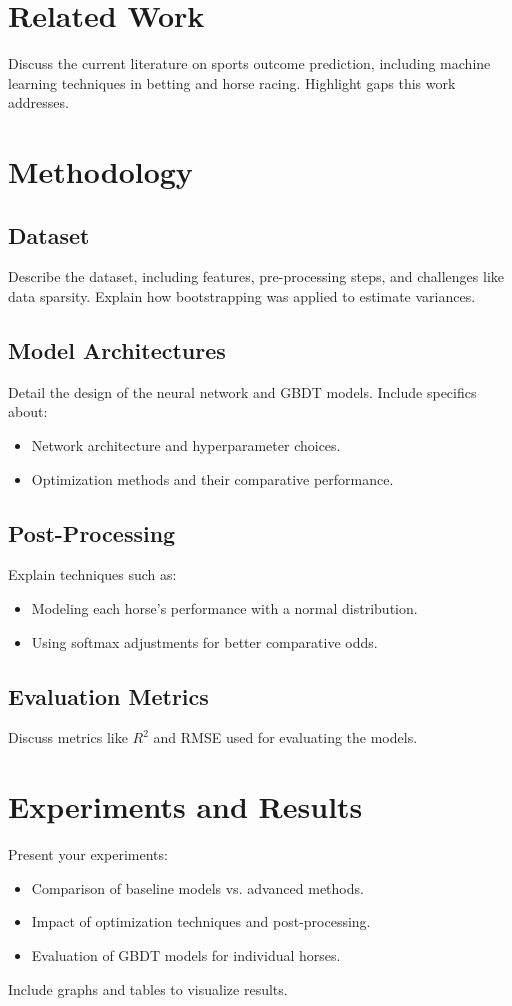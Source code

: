 \documentclass[twocolumn]{article}
\begin{document}
\section{Related Work}
Discuss the current literature on sports outcome prediction, including machine learning techniques in betting and horse racing. Highlight gaps this work addresses.

\section{Methodology}
\subsection{Dataset}
Describe the dataset, including features, pre-processing steps, and challenges like data sparsity. Explain how bootstrapping was applied to estimate variances.

\subsection{Model Architectures}
Detail the design of the neural network and GBDT models. Include specifics about:
\begin{itemize}
    \item Network architecture and hyperparameter choices.
    \item Optimization methods and their comparative performance.
\end{itemize}

\subsection{Post-Processing}
Explain techniques such as:
\begin{itemize}
    \item Modeling each horse's performance with a normal distribution.
    \item Using softmax adjustments for better comparative odds.
\end{itemize}

\subsection{Evaluation Metrics}
Discuss metrics like \(R^2\) and RMSE used for evaluating the models.

\section{Experiments and Results}
Present your experiments:
\begin{itemize}
    \item Comparison of baseline models vs. advanced methods.
    \item Impact of optimization techniques and post-processing.
    \item Evaluation of GBDT models for individual horses.
\end{itemize}
Include graphs and tables to visualize results.
\end{document}
